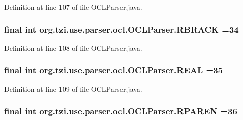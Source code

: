 Definition at line 107 of file O\-C\-L\-Parser.\-java.

\hypertarget{classorg_1_1tzi_1_1use_1_1parser_1_1ocl_1_1_o_c_l_parser_a74a124f12b2cc7fa3407385069bb6019}{
\subsubsection[{R\-B\-R\-A\-C\-K}]{\setlength{\rightskip}{0pt plus 5cm}final int org.\-tzi.\-use.\-parser.\-ocl.\-O\-C\-L\-Parser.\-R\-B\-R\-A\-C\-K =34\hspace{0.3cm}{\ttfamily [static]}}}\label{classorg_1_1tzi_1_1use_1_1parser_1_1ocl_1_1_o_c_l_parser_a74a124f12b2cc7fa3407385069bb6019}


Definition at line 108 of file O\-C\-L\-Parser.\-java.

\hypertarget{classorg_1_1tzi_1_1use_1_1parser_1_1ocl_1_1_o_c_l_parser_af4429e5104df75ca51dc6eb8c76e7001}{
\subsubsection[{R\-E\-A\-L}]{\setlength{\rightskip}{0pt plus 5cm}final int org.\-tzi.\-use.\-parser.\-ocl.\-O\-C\-L\-Parser.\-R\-E\-A\-L =35\hspace{0.3cm}{\ttfamily [static]}}}\label{classorg_1_1tzi_1_1use_1_1parser_1_1ocl_1_1_o_c_l_parser_af4429e5104df75ca51dc6eb8c76e7001}


Definition at line 109 of file O\-C\-L\-Parser.\-java.

\hypertarget{classorg_1_1tzi_1_1use_1_1parser_1_1ocl_1_1_o_c_l_parser_a90a74f0ba528deca6f767e731de7cdb0}{
\subsubsection[{R\-P\-A\-R\-E\-N}]{\setlength{\rightskip}{0pt plus 5cm}final int org.\-tzi.\-use.\-parser.\-ocl.\-O\-C\-L\-Parser.\-R\-P\-A\-R\-E\-N =36\hspace{0.3cm}{\ttfamily [static]}}}\label{classorg_1_1tzi_1_1use_1_1parser_1_1ocl_1_1_o_c_l_parser_a90a74f0ba528deca6f767e731de7cdb0}


